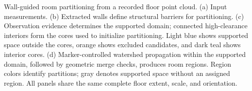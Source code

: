 \caption{Wall-guided room partitioning from a recorded floor point cloud. (a) Input measurements. (b) Extracted walls define structural barriers for partitioning. (c) Observation evidence determines the supported domain; connected high-clearance interiors form the cores used to initialize partitioning. Light blue shows supported space outside the cores, orange shows excluded candidates, and dark teal shows interior cores. (d) Marker-controlled watershed propagation within the supported domain, followed by geometric merge checks, produces room regions. Region colors identify partitions; gray denotes supported space without an assigned region. All panels share the same complete floor extent, scale, and orientation.}
